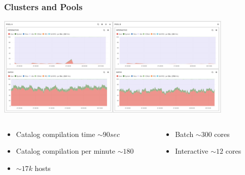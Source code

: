 \documentclass[aspectratio=169]{beamer}
\begin{document}
\begin{frame}

    \frametitle{Clusters and Pools}
    \begin{minipage}[t]{0.95\textwidth}
        \begin{center}
            \includegraphics[width=0.85\textwidth]{Puppet_Pools.png}
        \end{center}
    \end{minipage}
    \begin{minipage}[T]{0.95\textwidth}
        \begin{columns}
            \begin{column}{0.5\textwidth}
                \begin{itemize}
                    \item Catalog compilation time $\sim 90sec$
                    \item Catalog compilation per minute $\sim 180$
                    \item $\sim 17k$ hosts
                \end{itemize}
            \end{column}
            \begin{column}{0.5\textwidth}
                \begin{itemize}
                    \item Batch $\sim 300$ cores
                    \item Interactive $\sim 12$ cores
                \end{itemize}
            \end{column}
        \end{columns}
    \end{minipage}

\end{frame}

\end{document}
